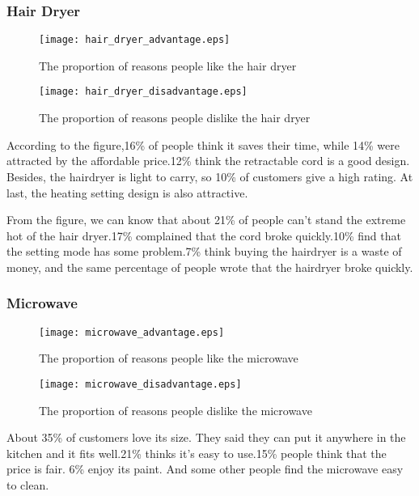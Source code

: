 \documentclass{mcmthesis}
\begin{document}
	
	\subsubsection{Hair Dryer}
	\begin{figure}[H]
		\begin{minipage}[t]{0.5\textwidth}
			\centering
			\texttt{[image: hair\_dryer\_advantage.eps]}
			\caption{The proportion of reasons people like the hair dryer}
		\end{minipage}
		\qquad
		\begin{minipage}[t]{0.5\textwidth}
			\centering
			\texttt{[image: hair\_dryer\_disadvantage.eps]}
			\caption{The proportion of reasons people dislike the hair dryer }
		\end{minipage}
	\end{figure}

		According to the figure,16\% of people think it saves their time, while 14\% were attracted by the affordable price.12\% think the retractable cord is a good design. Besides, the hairdryer is light to carry, so 10\% of customers give a high rating. At last, the heating setting design is also attractive.
		
		From the figure, we can know that about 21\% of people can't stand the extreme hot of the hair dryer.17\% complained that the cord broke quickly.10\% find that the setting mode has some problem.7\% think buying the hairdryer is a waste of money, and the same percentage of people wrote that the hairdryer broke quickly.
	
	\subsubsection{Microwave}
	\begin{figure}[H]
		\begin{minipage}[t]{0.5\textwidth}
			\centering
			\texttt{[image: microwave\_advantage.eps]}
			\caption{The proportion of reasons people like the microwave\label{fig:1}}
		\end{minipage}
		\qquad
		\begin{minipage}[t]{0.5\textwidth}
			\centering
			\texttt{[image: microwave\_disadvantage.eps]}
			\caption{The proportion of reasons people dislike the microwave\label{fig:2}}
		\end{minipage}
	\end{figure}

		About 35\% of customers love its size. They said they can put it anywhere in the kitchen and it fits well.21\% thinks it's easy to use.15\% people think that the price is fair.
		6\% enjoy its paint. And some other people find the microwave easy to clean.
\end{document}
